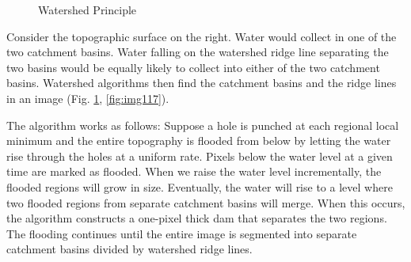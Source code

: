 \begin{figure}[htbp]
\centering
{}
\caption{ Watershed Principle}
\label{fig:WatershedPrinciple}
\end{figure} 

Consider the topographic surface on the right. Water would collect in
one of the two catchment basins. Water falling on the watershed ridge
line separating the two basins would be equally likely to collect into
either of the two catchment basins. Watershed algorithms then find the
catchment basins and the ridge lines in an image 
(Fig. \ref{fig:WatershedPrinciple}, \ref{fig:img117}).

The algorithm works as follows: Suppose a hole is punched at each
regional local minimum and the entire topography is flooded from below
by letting the water rise through the holes at a uniform rate. Pixels
below the water level at a given time are marked as flooded. When we
raise the water level incrementally, the flooded regions will grow in
size. Eventually, the water will rise to a level where two flooded
regions from separate catchment basins will merge. When this occurs,
the algorithm constructs a one-pixel thick dam that separates the two
regions. The flooding continues until the entire image is segmented
into separate catchment basins divided by watershed ridge lines.

